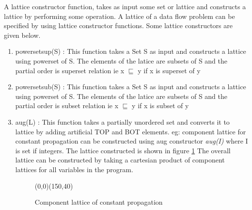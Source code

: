 \documentclass[12pt]{report}
\begin{document}
A lattice constructor function, takes as input some set or lattice and constructs a lattice by performing some operation. A lattice of a data flow problem can be specified by using lattice constructor functions. Some lattice constructors are given below.

\begin{enumerate}
\item powersetsup(S) : This function takes a Set S as input and constructs a lattice using powerset of S. The elements of the latice are subsets of S and the partial order is superset relation ie x $\sqsubseteq$ y if x is superset of y
\item powersetsub(S) : This function takes a Set S as input and constructs a lattice using powerset of S. The elements of the latice are subsets of S and the partial order is subset relation ie x $\sqsubseteq$ y if x is subset of y
\item aug(L) : This function takes a partially unordered set and converts it to lattice by adding artificial TOP and BOT elements. eg: component lattice for constant propagation can be constructed using aug constructor \emph{aug(I)} where I is set if integers. The lattice constructed is shown in figure \ref{constantpropagationlattice}
The overall lattice can be constructed by taking a cartesian product of component lattices for all variables in the program.

\begin{figure}[!htb]
			\begin{pspicture}(0,0)(150,40)
			\end{pspicture}
			\caption{Component lattice of constant propagation}
			\label{constantpropagationlattice}
			\end{figure}



\end{enumerate}
\end{document}
